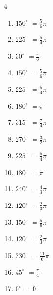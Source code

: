\begin{multicols}{4}
\begin{enumerate}
  \item $\displaystyle 150^{\circ}$
        $\displaystyle =\frac{5}{6}\pi$

  \item $\displaystyle 225^{\circ}$
        $\displaystyle =\frac{5}{4}\pi$

\columnbreak %

  \item $\displaystyle 30^{\circ}$
        $\displaystyle =\frac{\pi}{6}$

  \item $\displaystyle 150^{\circ}$
        $\displaystyle =\frac{5}{6}\pi$

  \item $\displaystyle 225^{\circ}$
        $\displaystyle =\frac{5}{4}\pi$

  \item $\displaystyle 180^{\circ}$
        $\displaystyle =\pi$

  \item $\displaystyle 315^{\circ}$
        $\displaystyle =\frac{7}{4}\pi$

  \item $\displaystyle 270^{\circ}$
        $\displaystyle =\frac{3}{2}\pi$

  \item $\displaystyle 225^{\circ}$
        $\displaystyle =\frac{5}{4}\pi$

  \item $\displaystyle 180^{\circ}$
        $\displaystyle =\pi$

  \item $\displaystyle 240^{\circ}$
        $\displaystyle =\frac{4}{3}\pi$

  \item $\displaystyle 120^{\circ}$
        $\displaystyle =\frac{2}{3}\pi$

  \item $\displaystyle 150^{\circ}$
        $\displaystyle =\frac{5}{6}\pi$

  \item $\displaystyle 120^{\circ}$
        $\displaystyle =\frac{2}{3}\pi$

  \item $\displaystyle 330^{\circ}$
        $\displaystyle =\frac{11}{6}\pi$

  \item $\displaystyle 45^{\circ}$
        $\displaystyle =\frac{\pi}{4}$

  \item $\displaystyle 0^{\circ}$
        $\displaystyle =0$


\end{enumerate}
\end{multicols}
